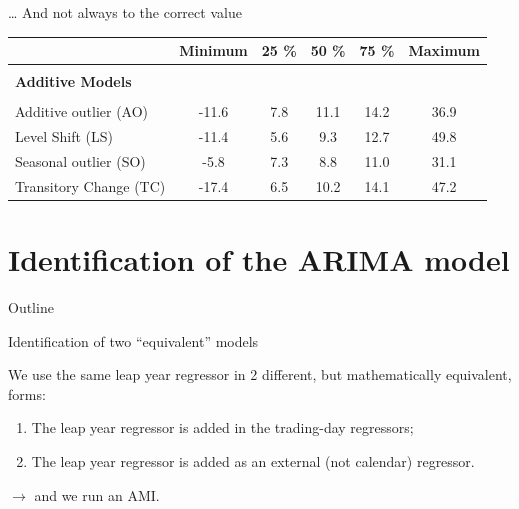 \documentclass[10pt]{beamer}
\begin{document}
\begin{frame}{\ldots{} And not always to the correct value}

\begin{table}
\begin{center}
\footnotesize
\begin{tabular}{lccccc}
\hline
\rule{0pt}{3ex}  & Minimum & 25 \% & 50 \% & 75 \% & Maximum\\
\hline
& & & & & \\
\bf{Additive Models} & & & & & \\
& & & & & \\
Additive outlier (AO) & -11.6 & 7.8 & 11.1 & 14.2 & 36.9\\
Level Shift (LS) & -11.4 & 5.6 & 9.3 & 12.7 & 49.8\\
Seasonal outlier (SO) & -5.8 & 7.3 & 8.8 & 11.0 & 31.1\\
Transitory Change (TC) & -17.4 & 6.5 & 10.2 & 14.1 & 47.2\\
\hline
\end{tabular}
\normalsize
\end{center}
\end{table}
\end{frame}

\section{Identification of the ARIMA model}
\begin{frame}{Outline}
\end{frame}

\begin{frame}{Identification of two ``equivalent'' models}

We use the same leap year regressor in 2 different, but mathematically equivalent, forms:
\begin{enumerate}
\def\labelenumi{\arabic{enumi}.}
\item   The leap year regressor is added in the trading-day regressors;
\item   The leap year regressor is added as an external (not calendar) regressor.
\end{enumerate}

\(\rightarrow\) and we run an AMI.

\end{frame}
\end{document}
